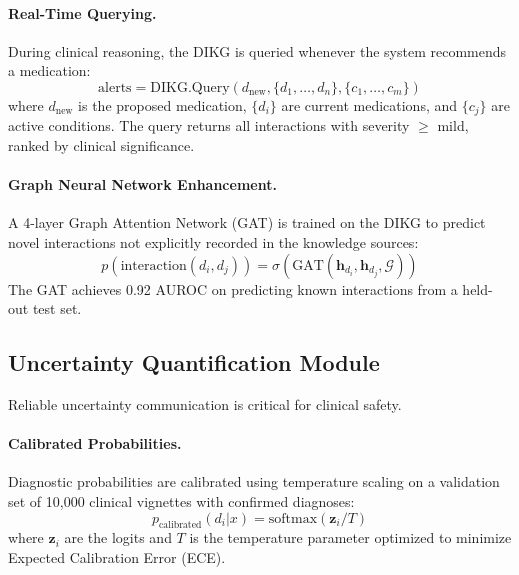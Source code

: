 \documentclass[11pt,a4paper]{article}
\begin{document}
\paragraph{Real-Time Querying.} During clinical reasoning, the DIKG is queried whenever the system recommends a medication:
\begin{equation}
    \text{alerts} = \text{DIKG.Query}(d_{\text{new}}, \{d_1, \ldots, d_n\}, \{c_1, \ldots, c_m\})
\end{equation}
where $d_{\text{new}}$ is the proposed medication, $\{d_i\}$ are current medications, and $\{c_j\}$ are active conditions. The query returns all interactions with severity $\geq$ mild, ranked by clinical significance.

\paragraph{Graph Neural Network Enhancement.} A 4-layer Graph Attention Network (GAT) is trained on the DIKG to predict novel interactions not explicitly recorded in the knowledge sources:
\begin{equation}
    p(\text{interaction}(d_i, d_j)) = \sigma(\text{GAT}(\bm{h}_{d_i}, \bm{h}_{d_j}, \mathcal{G}))
\end{equation}
The GAT achieves 0.92 AUROC on predicting known interactions from a held-out test set.

\subsection{Uncertainty Quantification Module}
\label{sec:uncertainty}

Reliable uncertainty communication is critical for clinical safety.

\paragraph{Calibrated Probabilities.} Diagnostic probabilities are calibrated using temperature scaling \citep{guo2017calibration} on a validation set of 10,000 clinical vignettes with confirmed diagnoses:
\begin{equation}
    p_{\text{calibrated}}(d_i | x) = \text{softmax}(\bm{z}_i / T)
\end{equation}
where $\bm{z}_i$ are the logits and $T$ is the temperature parameter optimized to minimize Expected Calibration Error (ECE).
\end{document}
